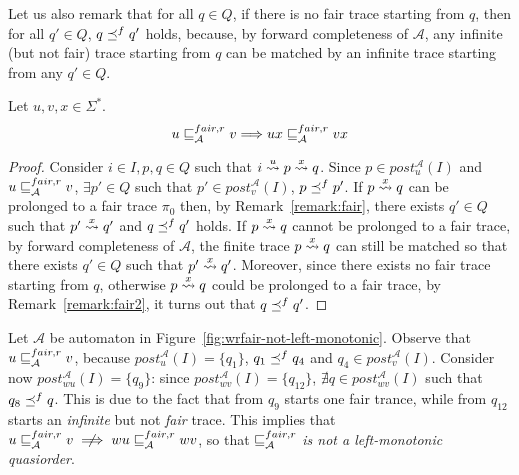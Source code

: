\begin{remark}\label{remark:fair2}
Let us also remark that for all $q\in Q$, if there is no fair
trace starting from $q$, then for all $q'\in Q$, $q \preceq^{f} q'$ holds,
because, by forward completeness of $\mathcal{A}$,
any infinite (but not fair) trace starting from $q$ can be matched by an
infinite trace starting from any $q'\in Q$.
\end{remark}

\begin{proposition}
\label{prop:monotonicity4}
Let $u,v,x \in \Sigma^*$.
\[ u \sqsubseteq_{\mathcal{A}}^{fair,r} v \Longrightarrow ux \sqsubseteq_{\mathcal{A}}^{fair,r} vx \]
\end{proposition}

\begin{proof}
Consider $i \in I, p,q \in Q$ such that $i \overset{u}{\rightsquigarrow} p \overset{x}{\rightsquigarrow} q$.
Since $p \in post^{\mathcal{A}}_{u}(I)$ and $u \sqsubseteq_{\mathcal{A}}^{fair,r} v$,
$\exists p' \in Q$
such that $p' \in post_v^{\mathcal{A}}(I)$, $p \preceq^{f} p'$.
If $p \overset{x}{\rightsquigarrow} q$ can be prolonged to a
fair trace $\pi_0$ then, by Remark~\ref{remark:fair}, there exists
$q' \in Q$ such that $p' \overset{x}{\rightsquigarrow} q'$ and $q \preceq^{f} q'$ holds.
If $p \overset{x}{\rightsquigarrow} q$ cannot be prolonged to a
fair trace,
by forward completeness of $\mathcal{A}$, the finite trace
$p \overset{x}{\rightsquigarrow} q$ can still be matched so that there exists
$q' \in Q$ such that $p' \overset{x}{\rightsquigarrow} q'$.
Moreover, since there exists no fair trace starting from $q$, otherwise
$p \overset{x}{\rightsquigarrow} q$ could be prolonged to a
fair trace, by Remark~\ref{remark:fair2}, it turns out that $q \preceq^{f} q'$.
\end{proof}

\begin{example}
Let $\mathcal{A}$ be automaton in Figure~\ref{fig:wrfair-not-left-monotonic}.
Observe that $u \sqsubseteq_{\mathcal{A}}^{fair,r} v$, because $post_{u}^{\mathcal{A}}(I) = \{q_1\}$,
$q_1 \preceq^{f} q_4$ and $q_4 \in post_{v}^{\mathcal{A}}(I)$.
Consider now $post_{wu}^{\mathcal{A}}(I) = \{q_9\}$: since
$post_{wv}^{\mathcal{A}}(I) = \{q_{12}\}$, $\nexists q \in post_{wv}^{\mathcal{A}}(I)$
such that $q_8 \preceq^{f} q$.
This is due to the fact that from $q_9$ starts one fair trance, while from
$q_{12}$ starts an \emph{infinite} but not \emph{fair} trace.
This implies that $u \wrfair{A} v \centernot\implies wu \wrfair{A} wv$, so that
$\sqsubseteq_{\mathcal{A}}^{fair,r}$ \emph{is not a left-monotonic quasiorder}.
\end{example}

